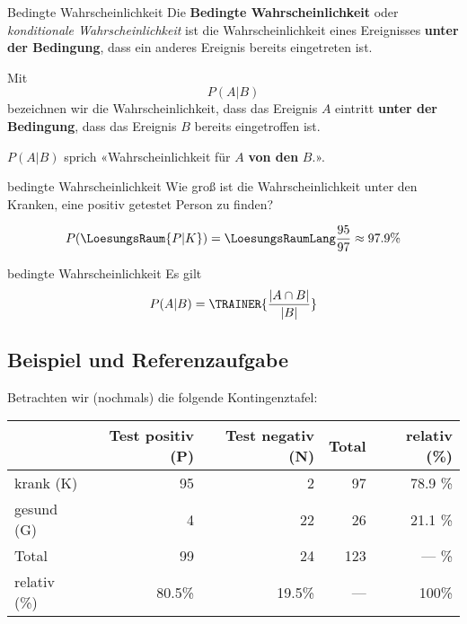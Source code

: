 \newpage


\begin{definition}{Bedingte Wahrscheinlichkeit}{}
Die \textbf{Bedingte Wahrscheinlichkeit} oder \textit{konditionale
  Wahrscheinlichkeit} ist die Wahrscheinlichkeit eines Ereignisses
\textbf{unter der Bedingung}, dass ein anderes Ereignis bereits
eingetreten ist.

  Mit
  $$P(A | B)$$
  bezeichnen wir die Wahrscheinlichkeit, dass das Ereignis $A$
  eintritt \textbf{unter der Bedingung}, dass das Ereignis $B$ bereits
  eingetroffen ist.
\end{definition}

\begin{bemerkung}{}{}
  $P(A|B)$ sprich «Wahrscheinlichkeit für $A$ \textbf{von den} $B$.».

\end{bemerkung}

\begin{beispiel}{bedingte Wahrscheinlichkeit}{}
  Wie groß ist die Wahrscheinlichkeit unter den Kranken, eine positiv
  getestet Person zu finden?

  \leserluft

  $$P(\LoesungsRaum{P|K})  = \LoesungsRaumLang{\frac{95}{97} \approx 97.9\%}$$
\end{beispiel}

\begin{gesetz}{bedingte Wahrscheinlichkeit}{}
  Es gilt
  $$P(A|B) = \TRAINER{\frac{|A\cap B|}{|B|}}$$  
\end{gesetz}

\newpage

\subsection{Beispiel und Referenzaufgabe}
Betrachten wir (nochmals) die folgende Kontingenztafel:

  \begin{tabular}{|l|r|r|r|r|}\hline
                 & Test positiv (P) & Test negativ (N)& Total & relativ (\%) \\\hline
    krank (K)    & 95               & 2               & 97    & 78.9 \%      \\\hline    
    gesund (G)   & 4                & 22              & 26    & 21.1 \%      \\\hline
    Total        & 99               & 24              & 123   &  --- \%      \\\hline
    relativ (\%) & 80.5\%           &19.5\%           & ---   &   100\%      \\\hline
  \end{tabular}
  
